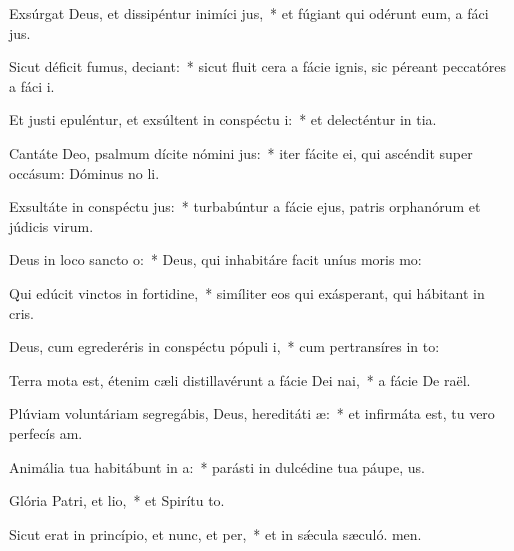 \item Exsúrgat Deus, et dissipéntur inimíci jus,~* et fúgiant qui odérunt eum, a fáci jus.
\item Sicut déficit fumus, deciant:~* sicut fluit cera a fácie ignis, sic péreant peccatóres a fáci i.
\item Et justi epuléntur, et exsúltent in conspéctu i:~* et delecténtur in tia.
\item Cantáte Deo, psalmum dícite nómini jus:~* iter fácite ei, qui ascéndit super occásum: Dóminus no li.
\item Exsultáte in conspéctu jus:~* turbabúntur a fácie ejus, patris orphanórum et júdicis virum.
\item Deus in loco sancto o:~* Deus, qui inhabitáre facit uníus moris  mo:
\item Qui edúcit vinctos in fortidine,~* simíliter eos qui exásperant, qui hábitant in cris.
\item Deus, cum egrederéris in conspéctu pópuli i,~* cum pertransíres in to:
\item Terra mota est, étenim cæli distillavérunt a fácie Dei nai,~* a fácie De raël.
\item Plúviam voluntáriam segregábis, Deus, hereditáti æ:~* et infirmáta est, tu vero perfecís am.
\item Animália tua habitábunt in a:~* parásti in dulcédine tua páupe, us.
\item Glória Patri, et lio,~* et Spirítu to.
\item Sicut erat in princípio, et nunc, et per,~* et in sǽcula sæculó. men.

